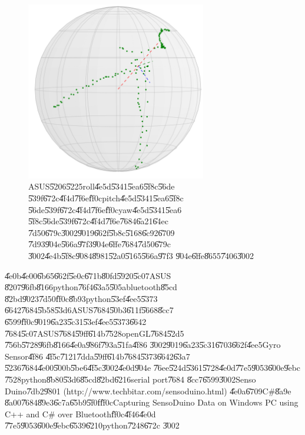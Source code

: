 \begin{figure}[th]
\caption{ASUS\U{5206}\U{5225}roll\U{4e5d}\U{5341}\U{5ea6}\U{5f8c}\U{56de}%
\U{539f}\U{672c}\U{4f4d}\U{7f6e}\U{ff0c}pitch\U{4e5d}\U{5341}\U{5ea6}\U{5f8c}%
\U{56de}\U{539f}\U{672c}\U{4f4d}\U{7f6e}\U{ff0c}yaw\U{4e5d}\U{5341}\U{5ea6}%
\U{5f8c}\U{56de}\U{539f}\U{672c}\U{4f4d}\U{7f6e}\U{7684}\U{6a21}\U{64ec}%
\U{7d50}\U{679c}\U{3002}\U{9019}\U{662f}\U{5b8c}\U{5168}\U{6c92}\U{6709}%
\U{7d93}\U{904e}\U{566a}\U{97f3}\U{904e}\U{6ffe}\U{7684}\U{7d50}\U{679c}%
\U{3002}\U{4e4b}\U{5f8c}\U{9084}\U{8981}\U{52a0}\U{5165}\U{566a}\U{97f3}%
\U{904e}\U{6ffe}\U{8655}\U{7406}\U{3002}}
\begin{center}
\includegraphics[width=0.7\textwidth]{./figs/ASUS_test.png}
\end{center}
\end{figure}

\U{4e0b}\U{4e00}\U{6b65}\U{662f}\U{5e0c}\U{671b}\U{80fd}\U{5920}\U{5c07}ASUS%
\U{8207}\U{96fb}\U{8166}python\U{76f4}\U{63a5}\U{505a}bluetooth\U{85cd}%
\U{82bd}\U{9023}\U{7d50}\U{ff0c}\U{8b93}python\U{53ef}\U{4ee5}\U{5373}%
\U{6642}\U{7684}\U{5b58}\U{53d6}ASUS\U{7684}\U{50b3}\U{611f}\U{5668}\U{8cc7}%
\U{6599}\U{ff0c}\U{9019}\U{6a23}\U{5c31}\U{53ef}\U{4ee5}\U{5373}\U{6642}%
\U{7684}\U{5c07}ASUS\U{7684}\U{59ff}\U{614b}\U{7528}openGL\U{7684}\U{52d5}%
\U{756b}\U{5728}\U{96fb}\U{8166}\U{4e0a}\U{986f}\U{793a}\U{51fa}\U{4f86}%
\U{3002}\U{9019}\U{6a23}\U{5c31}\U{6703}\U{662f}\U{4ee5}Gyro Sensor\U{4f86}%
\U{4f5c}\U{7121}\U{7dda}\U{59ff}\U{614b}\U{7684}\U{5373}\U{6642}\U{63a7}%
\U{5236}\U{7684}\U{4e00}\U{500b}\U{5be6}\U{4f5c}\U{3002}\U{4e0d}\U{904e}%
\U{76ee}\U{524d}\U{5361}\U{5728}\U{4e0d}\U{77e5}\U{9053}\U{600e}\U{9ebc}%
\U{7528}python\U{8b80}\U{53d6}\U{85cd}\U{82bd}\U{6216}serial port\U{7684}%
\U{8cc7}\U{6599}\U{3002}Senso Duino\U{7db2}\U{9801}
(http://www.techbitar.com/sensoduino.html) \U{4e0a}\U{6709}C\#\U{8a9e}%
\U{8a00}\U{7684}\U{89e3}\U{6c7a}\U{65b9}\U{5f0f}\U{ff0c}Capturing SensoDuino
Data on Windows PC using C++ and C\# over Bluetooth\U{ff0c}\U{4f46}\U{4e0d}%
\U{77e5}\U{9053}\U{600e}\U{9ebc}\U{6539}\U{6210}python\U{7248}\U{672c}%
\U{3002}

